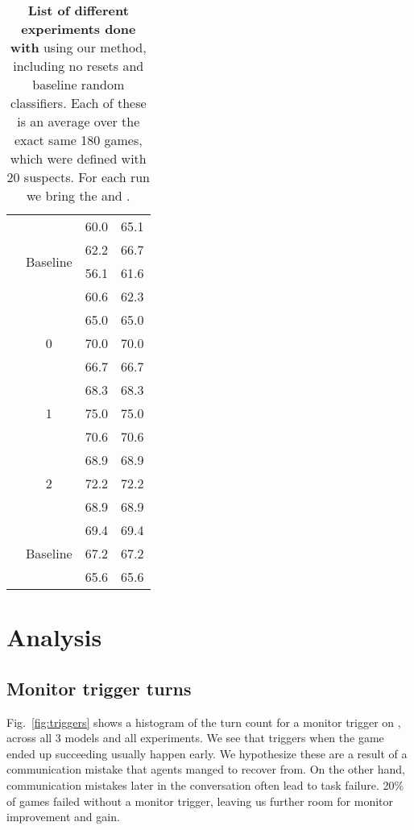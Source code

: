 \begin{table}
\begin{tabular}{|c| c c c|}
     & \multirow{4}{*}{Baseline} & 60.0 & 65.1 \\
     & & 62.2 & 66.7 \\
     & & 56.1 & 61.6 \\
     & & 60.6 & 62.3 \\
    
    \midrule
    
    \multirow{12}{*}{\gpt{}} & \multirow{3}{*}{0} & 65.0 & 65.0 \\
     & & 70.0 & 70.0 \\
     & & 66.7 & 66.7 \\
    \cline{2-4}
    
     & \multirow{3}{*}{1} & 68.3 & 68.3 \\
     & & 75.0 & 75.0 \\
     & & 70.6 & 70.6 \\
    \cline{2-4}
    
     & \multirow{3}{*}{2} & 68.9 & 68.9 \\
     & & 72.2 & 72.2 \\
     & & 68.9 & 68.9 \\
    \cline{2-4}
     & \multirow{3}{*}{Baseline} & 69.4 & 69.4 \\
     & & 67.2 & 67.2 \\
     & & 65.6 & 65.6 \\
    \bottomrule
  \end{tabular}

  \caption{\textbf{List of different experiments done with \ourenvsym{}}  using our method, including no resets and baseline random classifiers. Each of these is an average over the exact same 180 games, which were defined with 20 suspects. For each run we bring the \success{} and \precision{}. }
  \label{tab:symmresults}
\end{table}

\section{Analysis}
\subsection{Monitor trigger turns}
\label{app:triggers}
Fig.~\ref{fig:triggers} shows a histogram of the turn count for a monitor trigger on \ourenvasym{}, across all 3 models and all experiments. We see that triggers when the game ended up succeeding usually happen early. We hypothesize these are a result of a communication mistake that agents manged to recover from. On the other hand, communication mistakes later in the conversation often lead to task failure. 20\% of games failed without a monitor trigger, leaving us further room for monitor improvement and gain.

